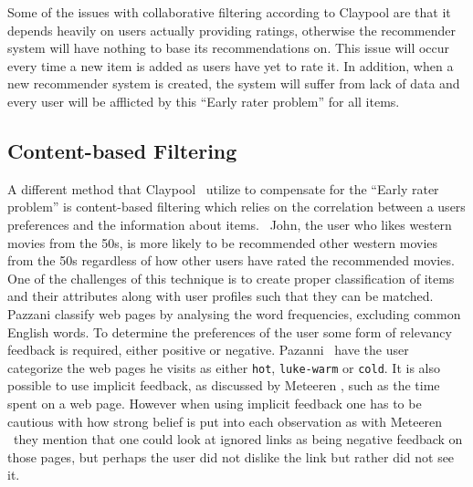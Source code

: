 Some of the issues with collaborative filtering according to Claypool \etal\cite{claypool1999combining} are that it depends heavily on users actually providing ratings, otherwise the recommender system will have nothing to base its recommendations on. This issue will occur every time a new item is added as users have yet to rate it.
In addition, when a new recommender system is created, the system will suffer from lack of data and every user will be afflicted by this ``Early rater problem'' for all items.


\subsection{Content-based Filtering}
\label{sec:analysis:recommender-methods:content-based-filtering}

A different method that Claypool \etal~utilize to compensate for the ``Early rater problem'' is content-based filtering which relies on the correlation between a users preferences and the information about items.
\eg~John, the user who likes western movies from the 50s, is more likely to be recommended other western movies from the 50s regardless of how other users have rated the recommended movies.
One of the challenges of this technique is to create proper classification of items and their attributes along with user profiles such that they can be matched.
Pazzani \etal\cite{pazzani1996syskill} classify web pages by analysing the word frequencies, excluding common English words.
To determine the preferences of the user some form of relevancy feedback is required, either positive or negative.
Pazanni \etal~have the user categorize the web pages he visits as either \texttt{hot}, \texttt{luke-warm} or \texttt{cold}.
It is also possible to use implicit feedback, as discussed by Meteeren \etal\cite{van2000using}, such as the time spent on a web page.
However when using implicit feedback one has to be cautious with how strong belief is put into each observation as with Meteeren \etal~they mention that one could look at ignored links as being negative feedback on those pages, but perhaps the user did not dislike the link but rather did not see it.


